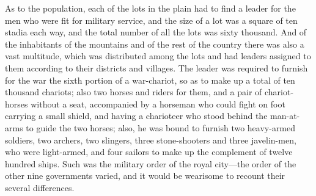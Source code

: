 \documentclass[11pt,letter]{article}
\begin{document}
\par  As to the population, each of the lots in the plain had to find a leader for the men who were fit for military service, and the size of a lot was a square of ten stadia each way, and the total number of all the lots was sixty thousand. And of the inhabitants of the mountains and of the rest of the country there was also a vast multitude, which was distributed among the lots and had leaders assigned to them according to their districts and villages. The leader was required to furnish for the war the sixth portion of a war-chariot, so as to make up a total of ten thousand chariots; also two horses and riders for them, and a pair of chariot-horses without a seat, accompanied by a horseman who could fight on foot carrying a small shield, and having a charioteer who stood behind the man-at-arms to guide the two horses; also, he was bound to furnish two heavy-armed soldiers, two archers, two slingers, three stone-shooters and three javelin-men, who were light-armed, and four sailors to make up the complement of twelve hundred ships. Such was the military order of the royal city—the order of the other nine governments varied, and it would be wearisome to recount their several differences.
\end{document}
